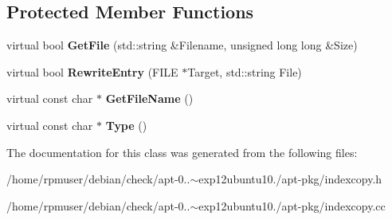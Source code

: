 \subsection*{\-Protected \-Member \-Functions}
\begin{DoxyCompactItemize}
\item 
virtual bool {\bfseries \-Get\-File} (std\-::string \&\-Filename, unsigned long long \&\-Size)\label{classSourceCopy_a6e537ba3dcb7ca8854dee7e9bead5c5e}

\item 
virtual bool {\bfseries \-Rewrite\-Entry} (\-F\-I\-L\-E $\ast$\-Target, std\-::string \-File)\label{classSourceCopy_a56581cf4bf4b32530c6fdeacb6051a65}

\item 
virtual const char $\ast$ {\bfseries \-Get\-File\-Name} ()\label{classSourceCopy_a30310e33e458ab5a340cca45aa4211cd}

\item 
virtual const char $\ast$ {\bfseries \-Type} ()\label{classSourceCopy_a6472491bac6385804dd5e43a29ef7714}

\end{DoxyCompactItemize}


\-The documentation for this class was generated from the following files\-:\begin{DoxyCompactItemize}
\item 
/home/rpmuser/debian/check/apt-\/0..$\sim$exp12ubuntu10./apt-\/pkg/indexcopy.\-h\item 
/home/rpmuser/debian/check/apt-\/0..$\sim$exp12ubuntu10./apt-\/pkg/indexcopy.\-cc\end{DoxyCompactItemize}
